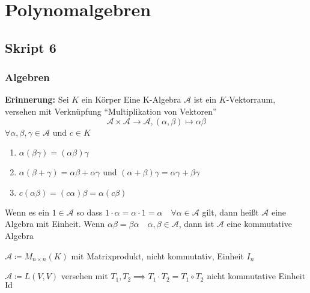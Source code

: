 \section{Polynomalgebren}
\setcounter{subsection}{5}
\subsection{Skript 6}
\subsubsection{Algebren}
\textbf{Erinnerung:} Sei $ K $ ein Körper Eine K-Algebra $ \mathcal{A}  $ ist ein $ K $-Vektorraum, versehen mit Verknüpfung ``Multiplikation von Vektoren''
\[
	\mathcal{A} \times \mathcal{A} \to \mathcal{A} , (\alpha, \beta) \mapsto \alpha\beta
\]
$ \forall \alpha, \beta, \gamma \in \mathcal{A}  $ und $ c \in K $ 
\begin{enumerate}[label=(\alph*)]
	\item $ \alpha(\beta \gamma) = (\alpha \beta) \gamma $ 
	\item $ \alpha(\beta + \gamma) = \alpha\beta + \alpha\gamma $ und $ (\alpha + \beta)\gamma = \alpha\gamma + \beta\gamma $ 
	\item $ c(\alpha \beta) = (c\alpha) \beta = \alpha (c\beta) $
\end{enumerate}
Wenn es ein $ 1 \in \mathcal{A}  $ so dass $ 1 \cdot \alpha = \alpha \cdot 1 = \alpha \quad \forall \alpha \in \mathcal{A}  $ gilt, dann heißt $ \mathcal{A}  $ eine Algebra mit Einheit. Wenn $ \alpha \beta = \beta \alpha \quad \alpha, \beta \in \mathcal{A}  $, dann ist $ \mathcal{A}  $ eine kommutative Algebra

\begin{subexample}
	$ \mathcal{A} \coloneqq M_{n \times n} (K) $ mit Matrixprodukt, nicht kommutativ, Einheit $ I_n $
\end{subexample}
\begin{subexample}
	$ \mathcal{A} \coloneqq L(V, V) $ versehen mit $ T_1, T_2 \implies T_1 \cdot T_2 = T_1 \circ T_2  $ nicht kommutative Einheit $ \operatorname{Id} $
\end{subexample}

